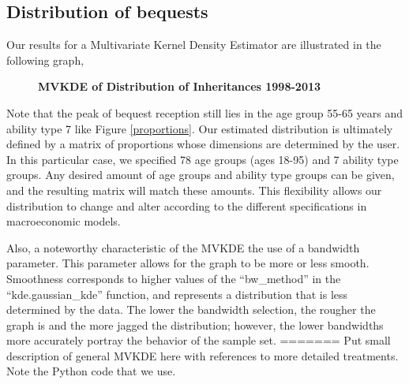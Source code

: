 \documentclass[letterpaper,12pt]{article}
\newcommand{\quotes}[1]{``#1''}
\theoremstyle{definition}
\begin{document}
\begin{spacing}{1.5}
  \subsection{Distribution of bequests}\label{SecDistEst}

    Our results for a Multivariate Kernel Density Estimator are illustrated in the following graph,\\

    \begin{figure}[htbp]\centering \captionsetup{width=6.0in}
    \caption{\label{MVKDE}\textbf{MVKDE of Distribution of Inheritances 1998-2013}}
  \end{figure}

\newpage
 Note that the peak of bequest reception still lies in the age group 55-65 years and ability type 7 like Figure \ref{proportions}. Our estimated distribution is ultimately defined by a matrix of proportions whose dimensions are determined by the user. In this particular case, we specified 78 age groups (ages 18-95) and 7 ability type groups. Any desired amount of age groups and ability type groups can be given, and the resulting matrix will match these amounts. This flexibility allows our distribution to change and alter according to the different specifications in macroeconomic models.

 Also, a noteworthy characteristic of the MVKDE the use of a bandwidth parameter. This parameter allows for the graph to be more or less smooth. Smoothness corresponds to higher values of the \quotes{bw\_method} in the \quotes{kde.gaussian\_kde} function, and represents a distribution that is less determined by the data. The lower the bandwidth selection, the rougher the graph is and the more jagged the distribution; however, the lower bandwidths more accurately portray the behavior of the sample set. 
=======
    Put small description of general MVKDE here with references to more detailed treatments. Note the Python code that we use.



\end{spacing}
\end{document}
